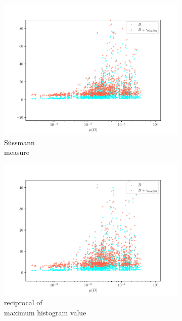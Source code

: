 \documentclass[12pt,a4paper,automark, toc=bib]{scrreprt}
\theoremstyle{definition}
\begin{document}
\begin{figure}
\begin{subfigure}{0.32\linewidth}
				\includegraphics[width=\linewidth]{figures/stat_sha384_0suessmann.pdf}
				\caption{Süssmann\\measure}
			\end{subfigure}
			\begin{subfigure}{0.32\linewidth}
				\includegraphics[width=\linewidth]{figures/stat_sha384_0max_hist_inverse.pdf}
				\caption{reciprocal of \\maximum histogram value}
			\end{subfigure}
			\begin{subfigure}{0.32\linewidth}

\end{subfigure}
\end{figure}
\end{document}
